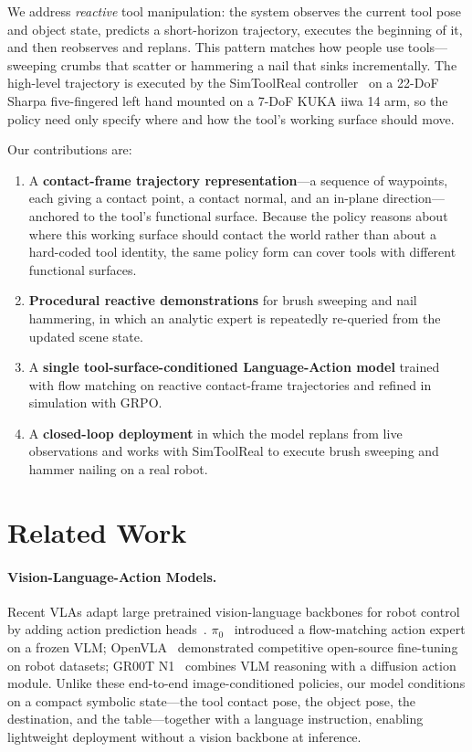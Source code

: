 \documentclass[11pt]{article}
\begin{document}
We address \emph{reactive} tool manipulation: the system observes the current tool pose and object state, predicts a short-horizon trajectory, executes the beginning of it, and then reobserves and replans.
This pattern matches how people use tools---sweeping crumbs that scatter or hammering a nail that sinks incrementally.
The high-level trajectory is executed by the SimToolReal controller~\cite{simtoolreal} on a 22-DoF Sharpa five-fingered left hand mounted on a 7-DoF KUKA iiwa 14 arm, so the policy need only specify where and how the tool's working surface should move.

Our contributions are:
\begin{enumerate}
  \item A \textbf{contact-frame trajectory representation}---a sequence of waypoints, each giving a contact point, a contact normal, and an in-plane direction---anchored to the tool's functional surface. Because the policy reasons about where this working surface should contact the world rather than about a hard-coded tool identity, the same policy form can cover tools with different functional surfaces.
  \item \textbf{Procedural reactive demonstrations} for brush sweeping and nail hammering, in which an analytic expert is repeatedly re-queried from the updated scene state.
  \item A \textbf{single tool-surface-conditioned Language-Action model} trained with flow matching on reactive contact-frame trajectories and refined in simulation with GRPO.
  \item A \textbf{closed-loop deployment} in which the model replans from live observations and works with SimToolReal to execute brush sweeping and hammer nailing on a real robot.
\end{enumerate}

\section{Related Work}

\paragraph{Vision-Language-Action Models.}
Recent VLAs adapt large pretrained vision-language backbones for robot control by adding action prediction heads~\cite{pi0,pi05,pi07,openvla,groot,rt2}.
$\pi_0$~\cite{pi0} introduced a flow-matching action expert on a frozen VLM; OpenVLA~\cite{openvla} demonstrated competitive open-source fine-tuning on robot datasets; GR00T N1~\cite{groot} combines VLM reasoning with a diffusion action module.
Unlike these end-to-end image-conditioned policies, our model conditions on a compact symbolic state---the tool contact pose, the object pose, the destination, and the table---together with a language instruction, enabling lightweight deployment without a vision backbone at inference.
\end{document}
